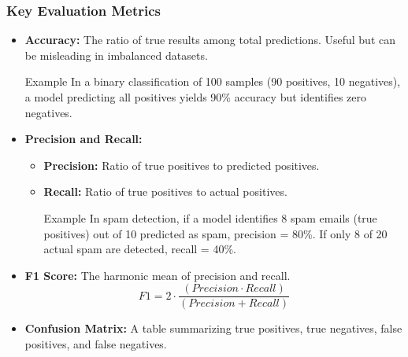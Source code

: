 \documentclass[aspectratio=169]{beamer}
\begin{document}
\begin{frame}[fragile]
    \frametitle{Key Evaluation Metrics}
    \begin{itemize}
        \item \textbf{Accuracy:} 
            The ratio of true results among total predictions. Useful but can be misleading in imbalanced datasets.
            \begin{block}{Example}
                In a binary classification of 100 samples (90 positives, 10 negatives), a model predicting all positives yields 90\% accuracy but identifies zero negatives.
            \end{block}

        \item \textbf{Precision and Recall:} 
            \begin{itemize}
                \item \textbf{Precision:} Ratio of true positives to predicted positives.
                \item \textbf{Recall:} Ratio of true positives to actual positives.
                \begin{block}{Example}
                    In spam detection, if a model identifies 8 spam emails (true positives) out of 10 predicted as spam, precision = 80\%. If only 8 of 20 actual spam are detected, recall = 40\%.
                \end{block}
            \end{itemize}

        \item \textbf{F1 Score:} The harmonic mean of precision and recall.
            \begin{equation}
                F1 = 2 \cdot \frac{(Precision \cdot Recall)}{(Precision + Recall)}
            \end{equation}

        \item \textbf{Confusion Matrix:} A table summarizing true positives, true negatives, false positives, and false negatives.
    \end{itemize}
\end{frame}
\end{document}
